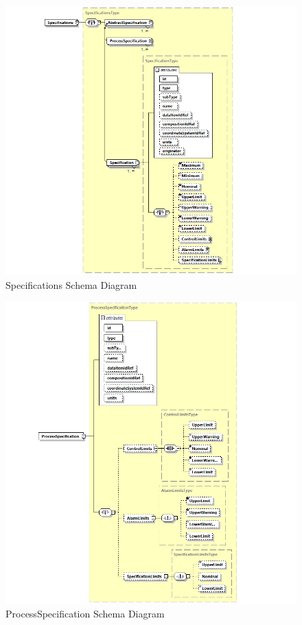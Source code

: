 \FloatBarrier


\begin{figure}[ht]
  \centering
    \includegraphics[width=1.0\textwidth]{figures/Specifications Schema.png}
  \caption{Specifications Schema Diagram}
  \label{fig:Specifications Schema Diagram}
\end{figure}

\FloatBarrier


\begin{figure}[ht]
  \centering
    \includegraphics[width=1.0\textwidth]{figures/ProcessSpecification Schema.png}
  \caption{ProcessSpecification Schema Diagram}
  \label{fig:ProcessSpecification Schema Diagram}
\end{figure}

\FloatBarrier
